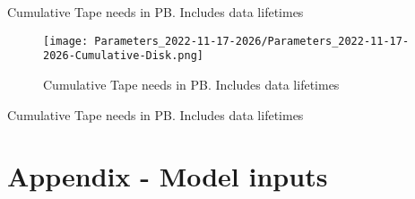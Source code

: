\begin{table}[h]
\centering{}\label{tab:Cumulative-Tape
}
\caption{Cumulative Tape needs in PB. Includes data lifetimes}
\end{table}
\begin{figure}[h]
\centering\texttt{[image: Parameters\_2022-11-17-2026/Parameters\_2022-11-17-2026-Cumulative-Disk.png]}\label{fig:Cumulative-Disk}
\caption{Cumulative Tape needs in PB. Includes data lifetimes}
\end{figure}
\begin{table}[h]
\centering{}\label{tab:Cumulative-Disk
}
\caption{Cumulative Tape needs in PB. Includes data lifetimes}
\end{table}

\clearpage
\section{Appendix - Model inputs}


